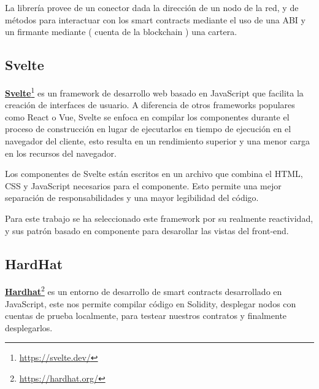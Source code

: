 \bigskip



\bigskip

La librería provee de un conector dada la dirección de un nodo de la red, y de métodos para interactuar con los smart contracts mediante el uso de una ABI y un firmante mediante ( cuenta de la blockchain ) una cartera.

\subsection{Svelte}

\textcolor{blue}{\href{https://svelte.dev/}{\textbf{Svelte}}}\footnote{\url{https://svelte.dev/}} es un framework de desarrollo web basado en JavaScript que facilita la creación de interfaces de usuario. A diferencia de otros frameworks populares como React o Vue, Svelte se enfoca en compilar los componentes durante el proceso de construcción en lugar de ejecutarlos en tiempo de ejecución en el navegador del cliente, esto resulta en un rendimiento superior y una menor carga en los recursos del navegador.

\bigskip

Los componentes de Svelte están escritos en un archivo  que combina el HTML, CSS y JavaScript necesarios para el componente. Esto permite una mejor separación de responsabilidades y una mayor legibilidad del código.

\bigskip



\bigskip

Para este trabajo se ha seleccionado este framework por su realmente reactividad, y sus patrón basado en componente para desarollar las vistas del front-end.

\subsection{HardHat}

\textcolor{blue}{\href{https://hardhat.org/}{\textbf{Hardhat}}}\footnote{\url{https://hardhat.org/}} es un entorno de desarrollo de smart contracts desarrollado en JavaScript, este nos permite compilar código en Solidity, desplegar nodos con cuentas de prueba localmente, para testear nuestros contratos y finalmente desplegarlos.

